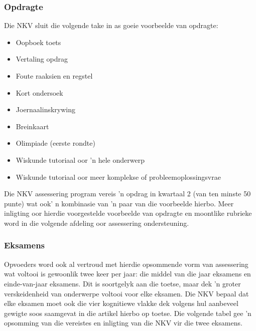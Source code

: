 \subsubsection{Opdragte}
Die NKV sluit die volgende take in as goeie voorbeelde van opdragte:
\begin{itemize}[noitemsep]
\item
  Oopboek toets
\item
  Vertaling opdrag
\item
  Foute raaksien en regstel
\item
  Kort ondersoek
\item
  Joernaalinskrywing
\item
  Breinkaart
\item
  Olimpiade (eerste rondte)
\item
  Wiskunde tutoriaal oor 'n hele onderwerp
\item
  Wiskunde tutoriaal oor meer komplekse of probleemoplossingsvrae
\end{itemize}
Die NKV assessering program vereis 'n opdrag in kwartaal 2 (van ten minste 50 punte) wat ook' n kombinasie van 'n paar van die voorbeelde hierbo. Meer inligting oor hierdie voorgestelde voorbeelde van opdragte en moontlike rubrieke word in die volgende afdeling oor assessering ondersteuning.

\subsubsection{Eksamens}
Opvoeders word ook al vertroud met hierdie opsommende vorm van assessering wat voltooi is gewoonlik twee keer per jaar: die middel van die jaar eksamens en einde-van-jaar eksamens. Dit is soortgelyk aan die toetse, maar dek 'n groter verskeidenheid van onderwerpe voltooi voor elke eksamen. Die NKV bepaal dat elke eksamen moet ook die vier kognitiewe vlakke dek volgens hul aanbeveel gewigte soos saamgevat in die artikel hierbo op toetse. Die volgende tabel gee 'n opsomming van die vereistes en inligting van die NKV vir die twee eksamens.

